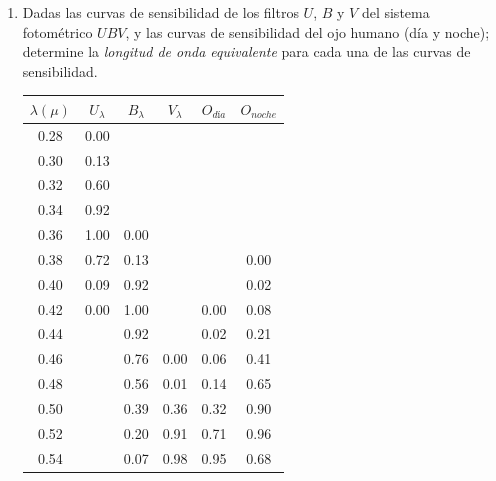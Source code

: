 \documentclass[10pt, spanish , a4paper, 1p]{elsarticle}
\begin{document}
  \begin{enumerate}[wide, labelwidth=!, labelindent=0pt, label=\textbf{\textrm{\arabic*)}}, ref=\arabic*]
    \item \label{p1} Dadas las curvas de sensibilidad de los filtros $U$, $B$ y $V$ del sistema fotométrico $UBV$, y las curvas de sensibilidad del ojo humano (día y noche); determine la \emph{longitud de onda equivalente} para cada una de las curvas de sensibilidad.

    \begin{table}[h!]
      \centering
      \begin{tabular}{ c | c | c | c | c | c }
        $\lambda(\mu)$ & $U_\lambda$ & $B_\lambda$ & $V_\lambda$ & $O_{\textit{d\'ia}}$ & $O_{noche}$ \\\hline
        0.28           & 0.00        &             &             &                   &      \\
        0.30           & 0.13        &             &             &                   &      \\
        0.32           & 0.60        &             &             &                   &      \\
        0.34           & 0.92        &             &             &                   &      \\
        0.36           & 1.00        & 0.00        &             &                   &      \\
        0.38           & 0.72        & 0.13        &             &                   & 0.00 \\
        0.40           & 0.09        & 0.92        &             &                   & 0.02 \\
        0.42           & 0.00        & 1.00        &             & 0.00              & 0.08 \\
        0.44           &             & 0.92        &             & 0.02              & 0.21 \\
        0.46           &             & 0.76        & 0.00        & 0.06              & 0.41 \\
        0.48           &             & 0.56        & 0.01        & 0.14              & 0.65 \\
        0.50           &             & 0.39        & 0.36        & 0.32              & 0.90 \\
        0.52           &             & 0.20        & 0.91        & 0.71              & 0.96 \\
        0.54           &             & 0.07        & 0.98        & 0.95              & 0.68 \\

\end{tabular}
\end{table}
\end{enumerate}
\end{document}
